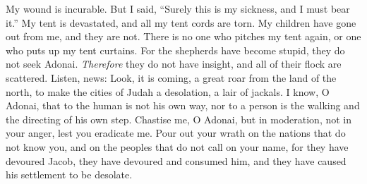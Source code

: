 \begin{biblechapter}
My wound is incurable. 
But I said, “Surely this is my sickness, 
and I must bear it.”
\verse My tent is devastated, 
and all my tent cords are torn. 
My children have gone out from me, 
and they are not. 
There is no one who pitches my tent again, 
or one who puts up my tent curtains.
\verse For the shepherds have become stupid, 
they do not seek Adonai. 
\textit{Therefore} they do not have insight, 
and all of their flock are scattered.
\verse Listen, news: 
Look, it is coming, 
a great roar from the land of the north, 
to make the cities of Judah a desolation, 
a lair of jackals.
\verse I know, O Adonai, that to the human is not his own way, 
nor to a person is the walking and the directing of his own step.
\verse Chastise me, O Adonai, but in moderation, 
not in your anger, lest you eradicate me.
\verse Pour out your wrath on the nations that do not know you, 
and on the peoples that do not call on your name, 
for they have devoured Jacob, 
they have devoured and consumed him, 
and they have caused his settlement to be desolate.
\end{biblechapter}

